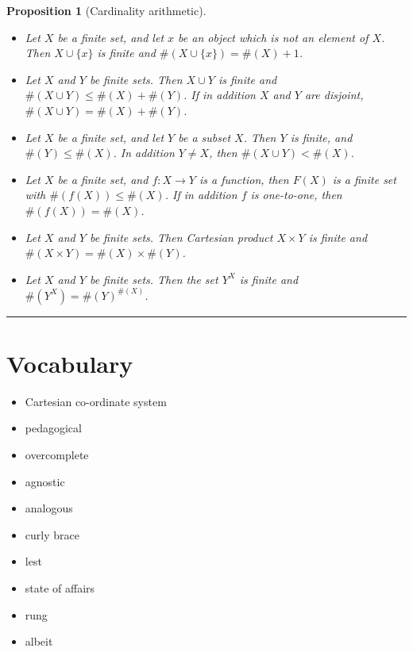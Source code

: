 \documentclass[
]{book}
\providecommand{\tightlist}{%
  \setlength{\itemsep}{0pt}\setlength{\parskip}{0pt}}
\newtheorem{proposition}{Proposition}[chapter]
\theoremstyle{definition}
\theoremstyle{definition}
\theoremstyle{definition}
\theoremstyle{definition}
\theoremstyle{remark}
\begin{document}
\begin{proposition}[Cardinality arithmetic]
\protect\hypertarget{prp:power}{}\label{prp:power}\leavevmode

\begin{itemize}
\tightlist
\item
  Let \(X\) be a finite set, and let \(x\) be an object which is not an element of \(X\). Then \(X\cup\{x\}\) is finite and \(\#(X\cup\{x\}) = \#(X)+1\).
\item
  Let \(X\) and \(Y\) be finite sets. Then \(X \cup Y\) is finite and \(\#(X\cup Y) \leq \#(X) +\#(Y)\). If in addition \(X\) and \(Y\) are disjoint, \(\#(X\cup Y) =\#(X) +\#(Y)\).
\item
  Let \(X\) be a finite set, and let \(Y\) be a subset \(X\). Then \(Y\) is finite, and \(\#(Y) \leq \#(X)\). In addition \(Y\ne X\), then \(\#(X\cup Y) < \#(X)\).
\item
  Let \(X\) be a finite set, and \(f:X\to Y\) is a function, then \(F(X)\) is a finite set with \(\#(f(X)) \leq \#(X)\). If in addition \(f\) is one-to-one, then \(\#(f(X)) = \#(X)\).
\item
  Let \(X\) and \(Y\) be finite sets. Then Cartesian product \(X\times Y\) is finite and \(\#(X\times Y) = \#(X)\times \#(Y)\).
\item
  Let \(X\) and \(Y\) be finite sets. Then the set \(Y^X\) is finite and \(\#(Y^X) = \#(Y)^{\#(X)}\).
\end{itemize}

\end{proposition}

\begin{center}\rule{0.5\linewidth}{0.5pt}\end{center}

\section{Vocabulary}\label{vocabulary-1}

\begin{itemize}
\tightlist
\item
  Cartesian co-ordinate system
\item
  pedagogical
\item
  overcomplete
\item
  agnostic
\item
  analogous
\item
  curly brace
\item
  lest
\item
  state of affairs
\item
  rung
\item
  albeit
\end{itemize}
\end{document}
